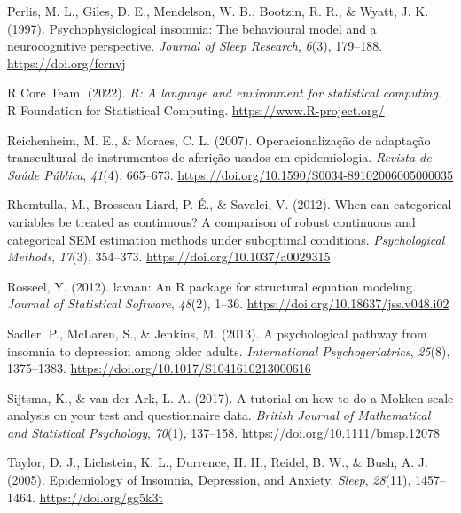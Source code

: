 \documentclass[
  ,doc,11pt, twoside,floatsintext]{apa6}
\newlength{\cslhangindent}
\newlength{\cslentryspacingunit} %
\newenvironment{CSLReferences}[2] %
 {%
  \setlength{\parindent}{0pt}
  \ifodd #1
  \let\oldpar\par
  \def\par{\hangindent=\cslhangindent\oldpar}
  \fi
  \setlength{\parskip}{#2\cslentryspacingunit}
 }%
 {}
\begin{document}
\begin{CSLReferences}{1}{0}
\leavevmode{}%
Perlis, M. L., Giles, D. E., Mendelson, W. B., Bootzin, R. R., \& Wyatt, J. K. (1997). Psychophysiological insomnia: The behavioural model and a neurocognitive perspective. \emph{Journal of Sleep Research}, \emph{6}(3), 179--188. \url{https://doi.org/fcrnvj}

\leavevmode{}%
R Core Team. (2022). \emph{R: A language and environment for statistical computing}. R Foundation for Statistical Computing. \url{https://www.R-project.org/}

\leavevmode{}%
Reichenheim, M. E., \& Moraes, C. L. (2007). {Operacionalização de adaptação transcultural de instrumentos de aferição usados em epidemiologia}. \emph{Revista de Saúde Pública}, \emph{41}(4), 665--673. \url{https://doi.org/10.1590/S0034-89102006005000035}

\leavevmode{}%
Rhemtulla, M., Brosseau-Liard, P. É., \& Savalei, V. (2012). When can categorical variables be treated as continuous? {A} comparison of robust continuous and categorical {SEM} estimation methods under suboptimal conditions. \emph{Psychological Methods}, \emph{17}(3), 354--373. \url{https://doi.org/10.1037/a0029315}

\leavevmode{}%
Rosseel, Y. (2012). {lavaan}: An {R} package for structural equation modeling. \emph{Journal of Statistical Software}, \emph{48}(2), 1--36. \url{https://doi.org/10.18637/jss.v048.i02}

\leavevmode{}%
Sadler, P., McLaren, S., \& Jenkins, M. (2013). A psychological pathway from insomnia to depression among older adults. \emph{International Psychogeriatrics}, \emph{25}(8), 1375--1383. \url{https://doi.org/10.1017/S1041610213000616}

\leavevmode{}%
Sijtsma, K., \& van der Ark, L. A. (2017). A tutorial on how to do a {Mokken} scale analysis on your test and questionnaire data. \emph{British Journal of Mathematical and Statistical Psychology}, \emph{70}(1), 137--158. \url{https://doi.org/10.1111/bmsp.12078}

\leavevmode{}%
Taylor, D. J., Lichstein, K. L., Durrence, H. H., Reidel, B. W., \& Bush, A. J. (2005). Epidemiology of {Insomnia}, {Depression}, and {Anxiety}. \emph{Sleep}, \emph{28}(11), 1457--1464. \url{https://doi.org/gg5k3t}


\end{CSLReferences}
\end{document}

